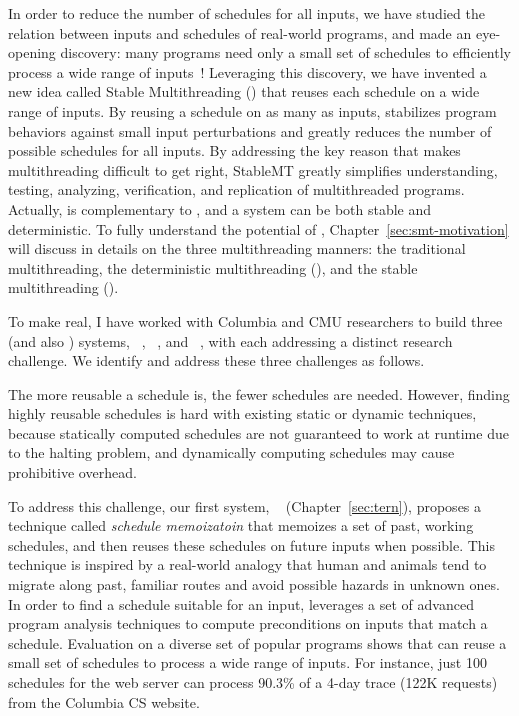 In order to reduce the number of schedules for all inputs, we have studied the
relation between inputs and schedules of real-world programs, and made an
eye-opening discovery: many programs need only a small set of schedules to
efficiently process a wide range of inputs~\cite{smt:cacm}! Leveraging this
discovery, we have invented a new idea called Stable Multithreading (\smt)
that reuses each schedule on a wide range of inputs. By reusing a schedule on as
many as inputs, \smt stabilizes program behaviors against small input
perturbations and greatly reduces the number of possible schedules for all
inputs. By addressing the key reason that makes multithreading difficult to get
right, StableMT greatly simplifies understanding, testing, analyzing,
verification, and replication of multithreaded programs. Actually, \smt is
complementary to \dmt,
and a system can be both stable and deterministic. To fully understand the
potential of \smt, Chapter~\ref{sec:smt-motivation} will discuss in details on
the three multithreading manners: the traditional multithreading, the
deterministic multithreading (\dmt), and the stable multithreading (\smt).


To make \smt real, I have worked with Columbia and CMU researchers to build
three \smt (and also \dmt) systems, \tern~\cite{cui:tern:osdi10},
\peregrine~\cite{peregrine:sosp11}, and \parrot~\cite{parrot:sosp13}, with each
addressing a distinct research challenge. We identify and address these three
challenges as follows.

 The more reusable a schedule is, the fewer schedules are needed.
However, finding highly reusable schedules is hard with existing static or
dynamic techniques, because statically computed schedules are not guaranteed to
work at runtime due to the halting problem, and dynamically computing schedules
may cause prohibitive overhead.

To address this challenge, our first \smt system, \tern~\cite{cui:tern:osdi10}
(Chapter~\ref{sec:tern}), proposes a technique called \emph{schedule
memoizatoin} that memoizes a set of past, working schedules, and then reuses
these schedules on future inputs when possible. This technique is inspired by a
real-world analogy that human and animals tend to migrate along past, familiar
routes and avoid possible hazards in unknown ones. In order to find a schedule
suitable for an input, \tern leverages a set of advanced program analysis
techniques to compute preconditions on inputs that match a schedule. Evaluation
on a diverse set of popular programs shows that \tern can reuse a small set of
schedules to process a wide range of inputs. For instance, just 100 schedules
for the \apache web server can process 90.3\% of a 4-day trace (122K requests)
from the Columbia CS website.

